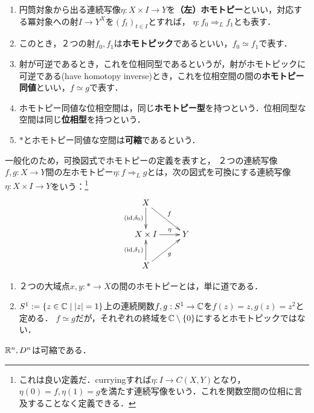 \documentclass[uplatex,dvipdfmx]{jsreport}
\begin{document}
\begin{definition}\mbox{}
    \begin{enumerate}
        \item 円筒対象から出る連続写像$\eta:X\times I\to Y$を\textbf{（左）ホモトピー}といい，対応する冪対象への射$I\to Y^X$を$(f_t)_{t\in I}$とすれば，
        $\eta:f_0\Rightarrow_Lf_1$とも表す．
        \item このとき，２つの射$f_0,f_1$は\textbf{ホモトピック}であるといい，$f_0\simeq f_1$で表す．
        \item 射が可逆であるとき，これを位相同型であるというが，射がホモトピックに可逆である(have homotopy inverse)とき，これを位相空間の間の\textbf{ホモトピー同値}といい，$f\simeq g$で表す．
        \item ホモトピー同値な位相空間は，同じ\textbf{ホモトピー型}を持つという．位相同型な空間は同じ\textbf{位相型}を持つという．
        \item $*$とホモトピー同値な空間は\textbf{可縮}であるという．
    \end{enumerate}
\end{definition}
\begin{remarks}
    一般化のため，可換図式でホモトピーの定義を表すと，
    ２つの連続写像$f,g:X\to Y$間の左ホモトピー$\eta:f\Rightarrow_L g$とは，次の図式を可換にする連続写像$\eta:X\times I\to Y$をいう：\footnote{これは良い定義だ．curryingすれば$\eta:I\to C(X,Y)$となり，$\eta(0)=f,\eta(1)=g$を満たす連続写像をいう．これを関数空間の位相に言及することなく定義できる．}
        \[\xymatrix{
            X\ar[dr]^-f\ar[d]_-{(\id,\delta_0)}\\
            X\times I\ar[r]^-\eta&Y\\
            X\ar[u]^-{(\id,\delta_1)}\ar[ur]_-g
        }\]
\end{remarks}

\begin{example}\mbox{}
    \begin{enumerate}
        \item ２つの大域点$x,y:*\to X$の間のホモトピーとは，単に道である．
        \item $S^1:=\left\{z\in\mathbb{C}\mid\lvert z\rvert=1\right\}$上の連続関数$f,g:S^1\to\mathbb{C}$を$f(z)=z,g(z)=z^2$と定める．
        $f\simeq g$だが，それぞれの終域を$\mathbb{C}\setminus\{0\}$にするとホモトピックではない．
    \end{enumerate}
\end{example}

\begin{example}[可縮な空間]
    $\mathbb{R}^n,D^n$は可縮である．
\end{example}
\end{document}
